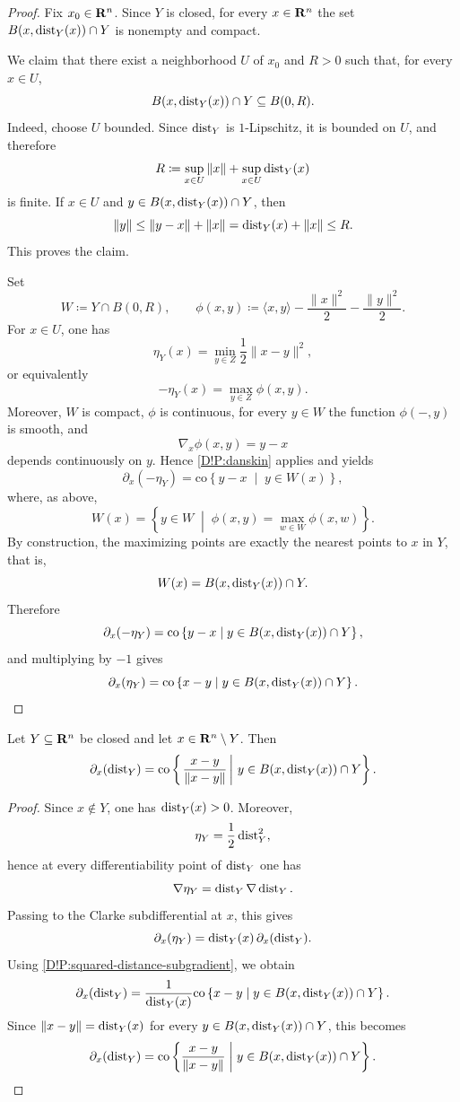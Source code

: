 \begin{proof}
  Fix $x_0 \in \mathbf{R}^n$. Since $Y$ is closed, for every $x \in \mathbf{R}^n$ the set $B(x,\operatorname{dist}_Y(x)) \cap Y$ is nonempty and compact.

  We claim that there exist a neighborhood $U$ of $x_0$ and $R>0$ such that, for every $x \in U$,
  \[
    B(x,\operatorname{dist}_Y(x)) \cap Y \subseteq B(0,R).
  \]
  Indeed, choose $U$ bounded. Since $\operatorname{dist}_Y$ is $1$-Lipschitz, it is bounded on $U$, and therefore
  \[
    R \coloneq \sup_{x \in U}\|x\|+\sup_{x \in U}\operatorname{dist}_Y(x)
  \]
  is finite. If $x \in U$ and $y \in B(x,\operatorname{dist}_Y(x)) \cap Y$, then
  \[
    \|y\| \leq \|y-x\|+\|x\|=\operatorname{dist}_Y(x)+\|x\| \leq R.
  \]
  This proves the claim.

  Set
  \[
    W \coloneq Y \cap B(0,R),
    \qquad
    \phi(x,y)\coloneq \langle x,y\rangle-\frac{\|x\|^2}{2}-\frac{\|y\|^2}{2}.
  \]
  For $x \in U$, one has
  \[
    \eta_Y(x)=\min_{y \in Z}\frac{1}{2}\|x-y\|^2,
  \]
  or equivalently
  \[
    -\eta_Y(x)=\max_{y \in Z}\phi(x,y).
  \]
  Moreover, $W$ is compact, $\phi$ is continuous, for every $y \in W$ the function $\phi(-,y)$ is smooth, and
  \[
    \nabla_x\phi(x,y)=y-x
  \]
  depends continuously on $y$. Hence \cref{D!P:danskin} applies and yields
  \[
    \partial_x(-\eta_Y)=\mathrm{co}\left\{ y-x \;\middle|\; y \in W(x)\right\},
  \]
  where, as above,
  \[
    W(x)=\left\{ y \in W \;\middle|\; \phi(x,y)=\max_{w \in W}\phi(x,w)\right\}.
  \]
  By construction, the maximizing points are exactly the nearest points to $x$ in $Y$, that is,
  \[
    W(x)=B(x,\operatorname{dist}_Y(x)) \cap Y.
  \]
  Therefore
  \[
    \partial_x(-\eta_Y)=\mathrm{co}\left\{ y-x \;\middle|\; y \in B(x,\operatorname{dist}_Y(x)) \cap Y \right\},
  \]
  and multiplying by $-1$ gives
  \[
    \partial_x(\eta_Y)= \mathrm{co}\left\{ x-y \;\middle|\; y \in B(x,\operatorname{dist}_Y(x)) \cap Y \right\}.
  \qedhere
  \]
\end{proof}

\begin{corollary}
\label{D!propo:subgradient1}
  Let $Y\subseteq \mathbf{R}^n$ be closed and let $x\in \mathbf{R}^n \setminus Y$. Then
  \[
    \partial_x(\operatorname{dist}_Y) = \mathrm{co}\left\{
    \left.
    \frac{x-y}{\|x-y\|}
    \,\right|\,
    y \in B(x,\operatorname{dist}_Y(x)) \cap Y
    \right\}.
  \]
\end{corollary}

\begin{proof}
  Since $x \notin Y$, one has $\operatorname{dist}_Y(x)>0$. Moreover,
  \[
    \eta_Y=\frac{1}{2}\operatorname{dist}_Y^2,
  \]
  hence at every differentiability point of $\operatorname{dist}_Y$ one has
  \[
    \nabla \eta_Y=\operatorname{dist}_Y \nabla \operatorname{dist}_Y.
  \]
  Passing to the Clarke subdifferential at $x$, this gives
  \[
    \partial_x(\eta_Y)=\operatorname{dist}_Y(x)\,\partial_x(\operatorname{dist}_Y).
  \]
  Using \cref{D!P:squared-distance-subgradient}, we obtain
  \[
    \partial_x(\operatorname{dist}_Y)
    =
    \frac{1}{\operatorname{dist}_Y(x)}
    \mathrm{co}\left\{ x-y \;\middle|\; y \in B(x,\operatorname{dist}_Y(x)) \cap Y \right\}.
  \]
  Since $\|x-y\|=\operatorname{dist}_Y(x)$ for every $y \in B(x,\operatorname{dist}_Y(x)) \cap Y$, this becomes
  \[
    \partial_x(\operatorname{dist}_Y) = \mathrm{co}\left\{
    \frac{x-y}{\|x-y\|}
    \;\middle|\;
    y \in B(x,\operatorname{dist}_Y(x)) \cap Y
    \right\}.
    \qedhere
  \]
\end{proof}

